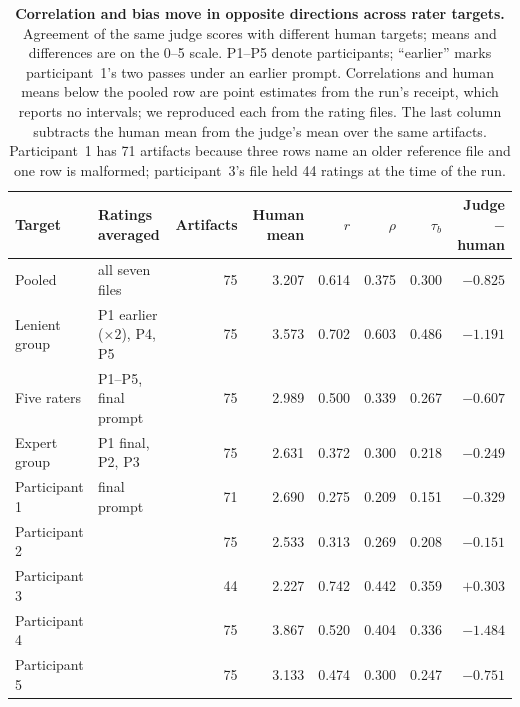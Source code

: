 \begin{table}[t]
\centering
\small
\begin{tabular}{llrrrrrr}
\toprule
Target & Ratings averaged & Artifacts & Human mean & $r$ & $\rho$ & $\tau_b$ & Judge $-$ human \\
\midrule
Pooled & all seven files & 75 & 3.207 & 0.614 & 0.375 & 0.300 & $-0.825$ \\
Lenient group & P1 earlier ($\times2$), P4, P5 & 75 & 3.573 & 0.702 & 0.603 & 0.486 & $-1.191$ \\
Five raters & P1--P5, final prompt & 75 & 2.989 & 0.500 & 0.339 & 0.267 & $-0.607$ \\
Expert group & P1 final, P2, P3 & 75 & 2.631 & 0.372 & 0.300 & 0.218 & $-0.249$ \\
\midrule
Participant 1 & final prompt & 71 & 2.690 & 0.275 & 0.209 & 0.151 & $-0.329$ \\
Participant 2 & & 75 & 2.533 & 0.313 & 0.269 & 0.208 & $-0.151$ \\
Participant 3 & & 44 & 2.227 & 0.742 & 0.442 & 0.359 & $+0.303$ \\
Participant 4 & & 75 & 3.867 & 0.520 & 0.404 & 0.336 & $-1.484$ \\
Participant 5 & & 75 & 3.133 & 0.474 & 0.300 & 0.247 & $-0.751$ \\
\bottomrule
\end{tabular}
\caption{\textbf{Correlation and bias move in opposite directions across rater targets.} Agreement of the same judge scores with different human targets; means and differences are on the 0--5 scale.
P1--P5 denote participants; ``earlier'' marks participant~1's two passes under an earlier prompt.
Correlations and human means below the pooled row are point estimates from the run's receipt, which reports no intervals; we reproduced each from the rating files.
The last column subtracts the human mean from the judge's mean over the same artifacts.
Participant~1 has 71 artifacts because three rows name an older reference file and one row is malformed; participant~3's file held 44 ratings at the time of the run.}
\label{tab:targets}
\end{table}

